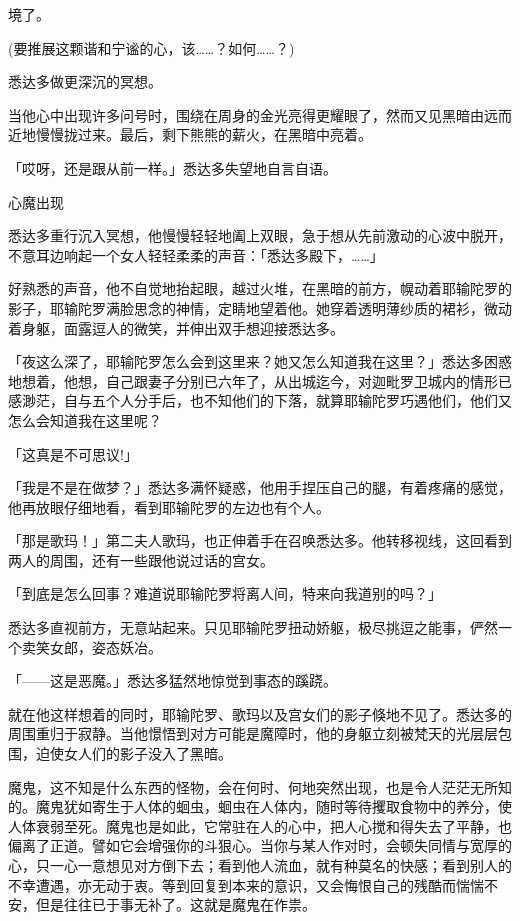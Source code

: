 \documentclass[12pt,twoside,openany]{book}
\begin{document}
境了。

(要推展这颗谐和宁谧的心，该……？如何……？)

悉达多做更深沉的冥想。

当他心中出现许多问号时，围绕在周身的金光亮得更耀眼了，然而又见黑暗由远而近地慢慢拢过来。最后，剩下熊熊的薪火，在黑暗中亮着。

「哎呀，还是跟从前一样。」悉达多失望地自言自语。

心魔出现

悉达多重行沉入冥想，他慢慢轻轻地阖上双眼，急于想从先前激动的心波中脱开，不意耳边响起一个女人轻轻柔柔的声音：「悉达多殿下，……」

好熟悉的声音，他不自觉地抬起眼，越过火堆，在黑暗的前方，幌动着耶输陀罗的影子，耶输陀罗满脸思念的神情，定睛地望着他。她穿着透明薄纱质的裙衫，微动着身躯，面露逗人的微笑，并伸出双手想迎接悉达多。

「夜这么深了，耶输陀罗怎么会到这里来？她又怎么知道我在这里？」悉达多困惑地想着，他想，自己跟妻子分别已六年了，从出城迄今，对迦毗罗卫城内的情形已感渺茫，自与五个人分手后，也不知他们的下落，就算耶输陀罗巧遇他们，他们又怎么会知道我在这里呢？

「这真是不可思议!」

「我是不是在做梦？」悉达多满怀疑惑，他用手捏压自己的腿，有着疼痛的感觉，他再放眼仔细地看，看到耶输陀罗的左边也有个人。

「那是歌玛！」第二夫人歌玛，也正伸着手在召唤悉达多。他转移视线，这回看到两人的周围，还有一些跟他说过话的宫女。

「到底是怎么回事？难道说耶输陀罗将离人间，特来向我道别的吗？」

悉达多直视前方，无意站起来。只见耶输陀罗扭动娇躯，极尽挑逗之能事，俨然一个卖笑女郎，姿态妖冶。

「——这是恶魔。」悉达多猛然地惊觉到事态的蹊跷。

就在他这样想着的同时，耶输陀罗、歌玛以及宫女们的影子倏地不见了。悉达多的周围重归于寂静。当他憬悟到对方可能是魔障时，他的身躯立刻被梵天的光层层包围，迫使女人们的影子没入了黑暗。

魔鬼，这不知是什么东西的怪物，会在何时、何地突然出现，也是令人茫茫无所知的。魔鬼犹如寄生于人体的蛔虫，蛔虫在人体内，随时等待攫取食物中的养分，使人体衰弱至死。魔鬼也是如此，它常驻在人的心中，把人心搅和得失去了平静，也偏离了正道。譬如它会增强你的斗狠心。当你与某人作对时，会顿失同情与宽厚的心，只一心一意想见对方倒下去；看到他人流血，就有种莫名的快感；看到别人的不幸遭遇，亦无动于衷。等到回复到本来的意识，又会悔恨自己的残酷而惴惴不安，但是往往已于事无补了。这就是魔鬼在作祟。
\end{document}
